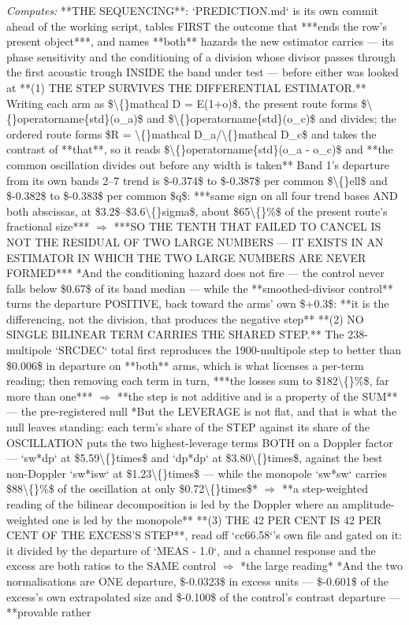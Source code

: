\begin{description}
\emph{Computes:}  **THE SEQUENCING**: `PREDICTION.md` is its own commit ahead of the working script, tables FIRST the outcome that ***ends the row's present object***, and names **both** hazards the new estimator carries --- its phase sensitivity and the conditioning of a division whose divisor passes through the first acoustic trough INSIDE the band under test --- before either was looked at   **(1) THE STEP SURVIVES THE DIFFERENTIAL ESTIMATOR.** Writing each arm as \$\textbackslash\{\}mathcal D = E(1+o)\$, the present route forms \$\textbackslash\{\}operatorname\{std\}(o\_a)\$ and \$\textbackslash\{\}operatorname\{std\}(o\_c)\$ and divides; the ordered route forms \$R = \textbackslash\{\}mathcal D\_a/\textbackslash\{\}mathcal D\_c\$ and takes the contrast of **that**, so it reads \$\textbackslash\{\}operatorname\{std\}(o\_a - o\_c)\$ and **the common oscillation divides out before any width is taken**  Band 1's departure from its own bands 2--7 trend is \$-0.374\$ to \$-0.387\$ per common \$\textbackslash\{\}ell\$ and \$-0.382\$ to \$-0.383\$ per common \$q\$: ***same sign on all four trend bases AND both abscissas, at \$3.2\$--\$3.6\textbackslash\{\}sigma\$, about \$65\textbackslash\{\}\%\$ of the present route's fractional size***  \ensuremath{\Rightarrow} ***SO THE TENTH THAT FAILED TO CANCEL IS NOT THE RESIDUAL OF TWO LARGE NUMBERS --- IT EXISTS IN AN ESTIMATOR IN WHICH THE TWO LARGE NUMBERS ARE NEVER FORMED***  *And the conditioning hazard does not fire --- the control never falls below \$0.67\$ of its band median --- while the **smoothed-divisor control** turns the departure POSITIVE, back toward the arms' own \$+0.3\$: **it is the differencing, not the division, that produces the negative step**   **(2) NO SINGLE BILINEAR TERM CARRIES THE SHARED STEP.** The 238-multipole `SRCDEC` total first reproduces the 1900-multipole step to better than \$0.006\$ in departure on **both** arms, which is what licenses a per-term reading; then removing each term in turn, ***the losses sum to \$182\textbackslash\{\}\%\$, far more than one*** \ensuremath{\Rightarrow} **the step is not additive and is a property of the SUM** --- the pre-registered null   *But the LEVERAGE is not flat, and that is what the null leaves standing: each term's share of the STEP against its share of the OSCILLATION puts the two highest-leverage terms BOTH on a Doppler factor --- `sw*dp` at \$5.59\textbackslash\{\}times\$ and `dp*dp` at \$3.80\textbackslash\{\}times\$, against the best non-Doppler `sw*isw` at \$1.23\textbackslash\{\}times\$ --- while the monopole `sw*sw` carries \$88\textbackslash\{\}\%\$ of the oscillation at only \$0.72\textbackslash\{\}times\$* \ensuremath{\Rightarrow} **a step-weighted reading of the bilinear decomposition is led by the Doppler where an amplitude-weighted one is led by the monopole**   **(3) THE 42 PER CENT IS 42 PER CENT OF THE EXCESS'S STEP**, read off `cc66.58`'s own file and gated on it: it divided by the departure of `MEAS - 1.0`, and a channel response and the excess are both ratios to the SAME control \ensuremath{\Rightarrow} *the large reading*  *And the two normalisations are ONE departure, \$-0.0323\$ in excess units --- \$-0.601\$ of the excess's own extrapolated size and \$-0.100\$ of the control's contrast departure --- **provable rather 
\end{description}
